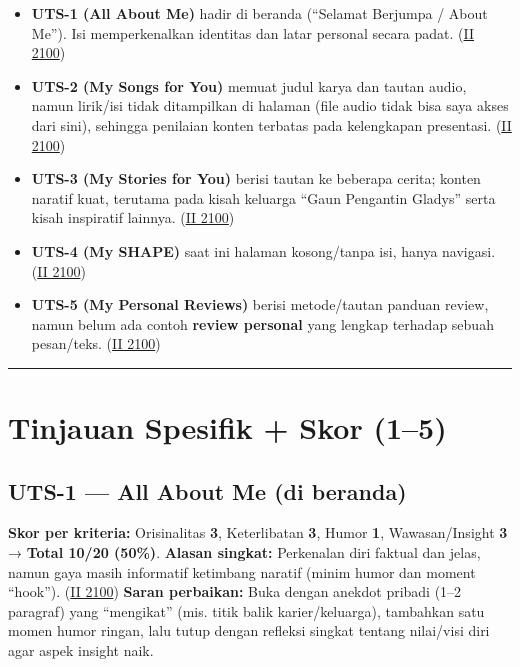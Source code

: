 \documentclass[
  letterpaper,
  DIV=11,
  numbers=noendperiod]{scrreprt}
\providecommand{\tightlist}{%
  \setlength{\itemsep}{0pt}\setlength{\parskip}{0pt}}
\begin{document}
\begin{itemize}
\tightlist
\item
  \textbf{UTS-1 (All About Me)} hadir di beranda (``Selamat Berjumpa /
  About Me''). Isi memperkenalkan identitas dan latar personal secara
  padat. (\href{https://ii-2100.github.io/all-about-me/}{II 2100})
\item
  \textbf{UTS-2 (My Songs for You)} memuat judul karya dan tautan audio,
  namun lirik/isi tidak ditampilkan di halaman (file audio tidak bisa
  saya akses dari sini), sehingga penilaian konten terbatas pada
  kelengkapan presentasi.
  (\href{https://ii-2100.github.io/all-about-me/My_Song_for_You/index.html}{II
  2100})
\item
  \textbf{UTS-3 (My Stories for You)} berisi tautan ke beberapa cerita;
  konten naratif kuat, terutama pada kisah keluarga ``Gaun Pengantin
  Gladys'' serta kisah inspiratif lainnya.
  (\href{https://ii-2100.github.io/all-about-me/My_Stories_for_You/index.html}{II
  2100})
\item
  \textbf{UTS-4 (My SHAPE)} saat ini halaman kosong/tanpa isi, hanya
  navigasi.
  (\href{https://ii-2100.github.io/all-about-me/My_Shapes/index.html}{II
  2100})
\item
  \textbf{UTS-5 (My Personal Reviews)} berisi metode/tautan panduan
  review, namun belum ada contoh \textbf{review personal} yang lengkap
  terhadap sebuah pesan/teks.
  (\href{https://ii-2100.github.io/all-about-me/My_Personal_Reviews/index.html}{II
  2100})
\end{itemize}

\begin{center}\rule{0.5\linewidth}{0.5pt}\end{center}

\section{Tinjauan Spesifik + Skor
(1--5)}\label{tinjauan-spesifik-skor-15}

\subsection{UTS-1 --- All About Me (di
beranda)}\label{uts-1-all-about-me-di-beranda}

\textbf{Skor per kriteria:} Orisinalitas \textbf{3}, Keterlibatan
\textbf{3}, Humor \textbf{1}, Wawasan/Insight \textbf{3} → \textbf{Total
10/20 (50\%)}. \textbf{Alasan singkat:} Perkenalan diri faktual dan
jelas, namun gaya masih informatif ketimbang naratif (minim humor dan
moment ``hook''). (\href{https://ii-2100.github.io/all-about-me/}{II
2100}) \textbf{Saran perbaikan:} Buka dengan anekdot pribadi (1--2
paragraf) yang ``mengikat'' (mis. titik balik karier/keluarga),
tambahkan satu momen humor ringan, lalu tutup dengan refleksi singkat
tentang nilai/visi diri agar aspek insight naik.
\end{document}

